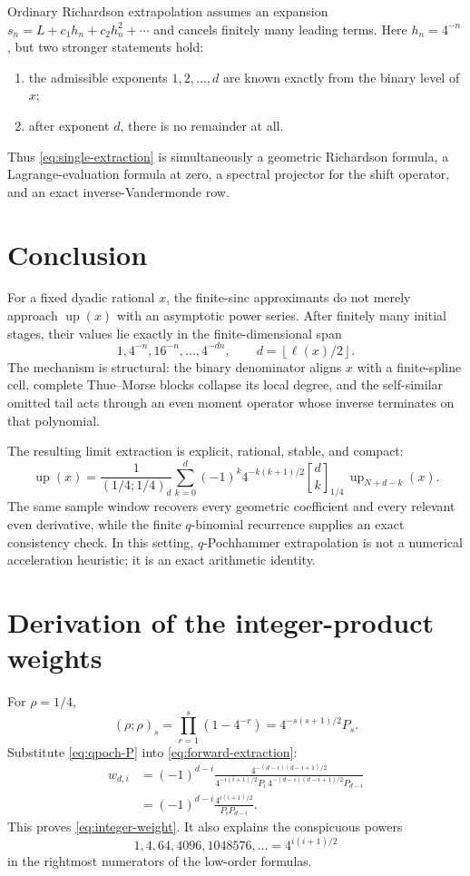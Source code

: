 \documentclass[11pt,oneside]{article}
\theoremstyle{definition}
\theoremstyle{remark}
\newcommand{\up}{\operatorname{up}}
\newcommand{\qbinom}[3]{\genfrac{[}{]}{0pt}{}{#1}{#2}_{#3}}
\newcommand{\floor}[1]{\left\lfloor#1\right\rfloor}
\begin{document}
Ordinary Richardson extrapolation assumes an expansion
\(s_n=L+c_1h_n+c_2h_n^2+\cdots\) and cancels finitely many leading terms.
Here \(h_n=4^{-n}\), but two stronger statements hold:
\begin{enumerate}
 \item the admissible exponents \(1,2,\ldots,d\) are known exactly from the
 binary level of \(x\);
 \item after exponent \(d\), there is no remainder at all.
\end{enumerate}
Thus \eqref{eq:single-extraction} is simultaneously a geometric Richardson
formula, a Lagrange-evaluation formula at zero, a spectral projector for the
shift operator, and an exact inverse-Vandermonde row.

\section{Conclusion}

For a fixed dyadic rational \(x\), the finite-sinc approximants do not merely
approach \(\up(x)\) with an asymptotic power series.  After finitely many
initial stages, their values lie exactly in the finite-dimensional span
\[
 1,4^{-n},16^{-n},\ldots,4^{-dn},
 \qquad d=\floor{\ell(x)/2}.
\]
The mechanism is structural: the binary denominator aligns \(x\) with a
finite-spline cell, complete Thue--Morse blocks collapse its local degree, and
the self-similar omitted tail acts through an even moment operator whose
inverse terminates on that polynomial.

The resulting limit extraction is explicit, rational, stable, and compact:
\[
 \up(x)=\frac{1}{(1/4;1/4)_d}
 \sum_{k=0}^{d}(-1)^k4^{-k(k+1)/2}
 \qbinom{d}{k}{1/4}\,\up_{N+d-k}(x).
\]
The same sample window recovers every geometric coefficient and every relevant
even derivative, while the finite \(q\)-binomial recurrence supplies an exact
consistency check.  In this setting, \(q\)-Pochhammer extrapolation is not a
numerical acceleration heuristic; it is an exact arithmetic identity.

\appendix

\section{Derivation of the integer-product weights}

For \(\rho=1/4\),
\begin{equation}\label{eq:qpoch-P}
 (\rho;\rho)_s
 =\prod_{r=1}^{s}(1-4^{-r})
 =4^{-s(s+1)/2}P_s.
\end{equation}
Substitute \eqref{eq:qpoch-P} into \eqref{eq:forward-extraction}:
\begin{align*}
 w_{d,i}
 &=(-1)^{d-i}
 \frac{4^{-(d-i)(d-i+1)/2}}
 {4^{-i(i+1)/2}P_i\,
  4^{-(d-i)(d-i+1)/2}P_{d-i}}\\
 &=(-1)^{d-i}\frac{4^{i(i+1)/2}}{P_iP_{d-i}}.
\end{align*}
This proves \eqref{eq:integer-weight}.  It also explains the conspicuous
powers
\[
 1,4,64,4096,1048576,\ldots=4^{i(i+1)/2}
\]
in the rightmost numerators of the low-order formulas.
\end{document}
